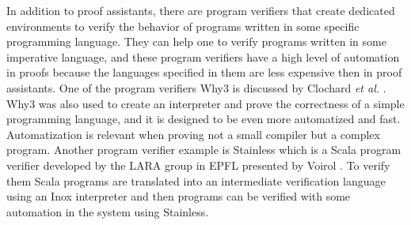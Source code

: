 In addition to proof assistants, there are program verifiers that create dedicated environments to verify the behavior of programs written in some specific programming language. They can help one to verify programs written in some imperative language, and these program verifiers have a high level of automation in proofs because the languages specified in them are less expensive then in proof assistants. One of the program verifiers Why3 is discussed by Clochard \emph{et al.} \cite{why3}. Why3 was also used to create an interpreter and prove the correctness of a simple programming language, and it is designed to be even more automatized and fast. Automatization is relevant when proving not a small compiler but a complex program. Another program verifier example is Stainless which is a Scala program verifier developed by the LARA group in EPFL presented by Voirol \cite{stainless}. To verify them Scala programs are translated into an intermediate verification language using an Inox interpreter and then programs can be verified with some automation in the system using Stainless.


